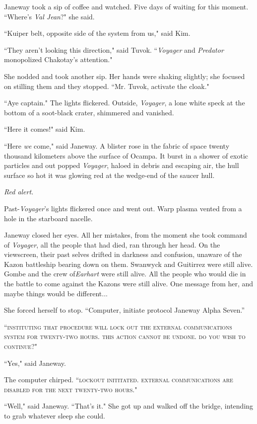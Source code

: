 \documentclass[twoside,letterpaper,12pt]{memoir}
\begin{document}
Janeway took a sip of coffee and watched. Five days of waiting for this moment. ``Where's \textit{Val Jean}?" she said. 

``Kuiper belt, opposite side of the system from us," said Kim. 

``They aren't looking this direction," said Tuvok. ``\textit{Voyager }and \textit{Predator} monopolized Chakotay's attention." 

She nodded and took another sip. Her hands were shaking slightly; she focused on stilling them and they stopped. ``Mr. Tuvok, activate the cloak." 

``Aye captain." The lights flickered. Outside, \textit{Voyager}, a lone white speck at the bottom of a soot-black crater, shimmered and vanished. 

``Here it comes!" said Kim. 

``Here \textit{we} come," said Janeway. A blister rose in the fabric of space twenty thousand kilometers above the surface of Ocampa. It burst in a shower of exotic particles and out popped \textit{Voyager}, haloed in debris and escaping air, the hull surface so hot it was glowing red at the wedge-end of the saucer hull. 

\textit{Red alert.} 

Past-\textit{Voyager}'s lights flickered once and went out. Warp plasma vented from a hole in the starboard nacelle. 

Janeway closed her eyes. All her mistakes, from the moment she took command of \textit{Voyager}, all the people that had died, ran through her head. On the viewscreen, their past selves drifted in darkness and confusion, unaware of the Kazon battleship bearing down on them. Swanwyck and Guitirrez were still alive. Gombe and the crew of\textit{Earhart }were still alive. All the people who would die in the battle to come against the Kazons were still alive. One message from her, and maybe things would be different...

She forced herself to stop. “Computer, initiate protocol Janeway Alpha Seven.” 

``\textsc{instituting that procedure will lock out the external communications system for twenty-two hours. this action cannot be undone. do you wish to continue?}" 

``Yes," said Janeway. 

The computer chirped. ``\textsc{lockout inititated. external communications are disabled for the next twenty-two hours}." 

``Well," said Janeway. ``That's it." She got up and walked off the bridge, intending to grab whatever sleep she could. 
\end{document}
